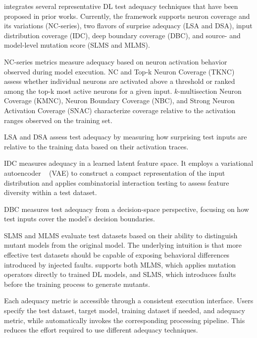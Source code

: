 \tool integrates several representative DL test adequacy techniques that have been proposed in prior works. 
Currently, the framework supports neuron coverage and its variations (NC-series), two flavors of surprise adequacy (LSA and DSA), input distribution coverage (IDC), deep boundary coverage (DBC), and source- and model-level mutation score (SLMS and MLMS).

NC-series metrics measure adequacy based on neuron activation behavior observed during model execution.
NC and Top-k Neuron Coverage (TKNC) assess whether individual neurons are activated above a threshold or ranked among the top-k most active neurons for a given input. 
$k$-multisection Neuron Coverage (KMNC), Neuron Boundary Coverage (NBC), and Strong Neuron Activation Coverage (SNAC) characterize coverage relative to the activation ranges observed on the training set.

LSA and DSA assess test adequacy by measuring how surprising test inputs are relative to the training data based on their activation traces.

IDC measures adequacy in a learned latent feature space.
It employs a variational autoencoder ~\cite{bib:kingma2014autoencoding,bib:higgins2017betavae} (VAE) to construct a compact representation of the input distribution and applies combinatorial interaction testing to assess feature diversity within a test dataset.

DBC measures test adequacy from a decision-space perspective, focusing on how test inputs cover the model’s decision boundaries.

SLMS and MLMS evaluate test datasets based on their ability to distinguish mutant models from the original model.
The underlying intuition is that more effective test datasets should be capable of exposing behavioral differences introduced by injected faults.
\tool supports both MLMS, which applies mutation operators directly to trained DL models, and SLMS, which introduces faults before the training process to generate mutants.

Each adequacy metric is accessible through a consistent execution interface. Users specify the test dataset, target model, training dataset if needed, and adequacy metric, while \tool automatically invokes the corresponding processing pipeline. This reduces the effort required to use different adequacy techniques.

